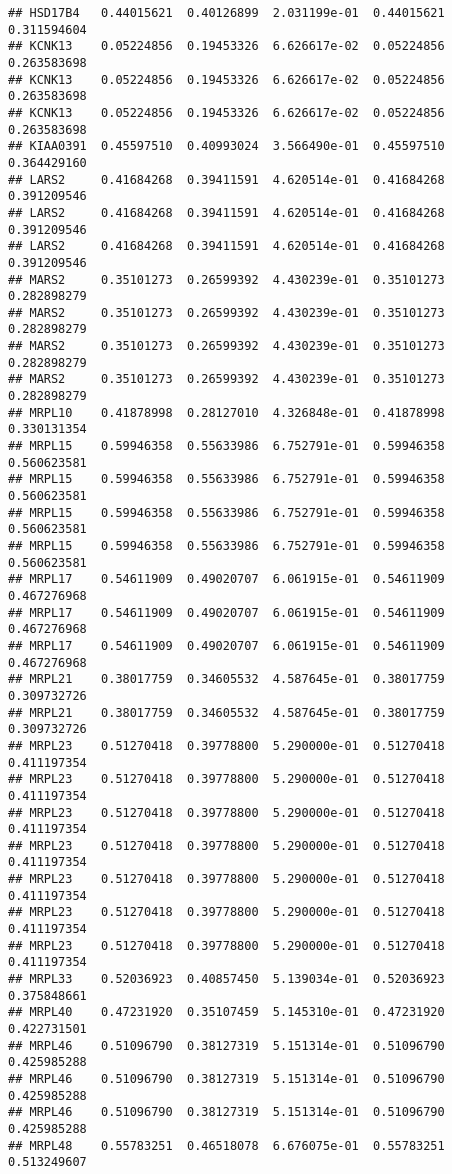 \documentclass[
]{article}
\begin{document}
\begin{verbatim}
## HSD17B4   0.44015621  0.40126899  2.031199e-01  0.44015621  0.311594604
## KCNK13    0.05224856  0.19453326  6.626617e-02  0.05224856  0.263583698
## KCNK13    0.05224856  0.19453326  6.626617e-02  0.05224856  0.263583698
## KCNK13    0.05224856  0.19453326  6.626617e-02  0.05224856  0.263583698
## KIAA0391  0.45597510  0.40993024  3.566490e-01  0.45597510  0.364429160
## LARS2     0.41684268  0.39411591  4.620514e-01  0.41684268  0.391209546
## LARS2     0.41684268  0.39411591  4.620514e-01  0.41684268  0.391209546
## LARS2     0.41684268  0.39411591  4.620514e-01  0.41684268  0.391209546
## MARS2     0.35101273  0.26599392  4.430239e-01  0.35101273  0.282898279
## MARS2     0.35101273  0.26599392  4.430239e-01  0.35101273  0.282898279
## MARS2     0.35101273  0.26599392  4.430239e-01  0.35101273  0.282898279
## MARS2     0.35101273  0.26599392  4.430239e-01  0.35101273  0.282898279
## MRPL10    0.41878998  0.28127010  4.326848e-01  0.41878998  0.330131354
## MRPL15    0.59946358  0.55633986  6.752791e-01  0.59946358  0.560623581
## MRPL15    0.59946358  0.55633986  6.752791e-01  0.59946358  0.560623581
## MRPL15    0.59946358  0.55633986  6.752791e-01  0.59946358  0.560623581
## MRPL15    0.59946358  0.55633986  6.752791e-01  0.59946358  0.560623581
## MRPL17    0.54611909  0.49020707  6.061915e-01  0.54611909  0.467276968
## MRPL17    0.54611909  0.49020707  6.061915e-01  0.54611909  0.467276968
## MRPL17    0.54611909  0.49020707  6.061915e-01  0.54611909  0.467276968
## MRPL21    0.38017759  0.34605532  4.587645e-01  0.38017759  0.309732726
## MRPL21    0.38017759  0.34605532  4.587645e-01  0.38017759  0.309732726
## MRPL23    0.51270418  0.39778800  5.290000e-01  0.51270418  0.411197354
## MRPL23    0.51270418  0.39778800  5.290000e-01  0.51270418  0.411197354
## MRPL23    0.51270418  0.39778800  5.290000e-01  0.51270418  0.411197354
## MRPL23    0.51270418  0.39778800  5.290000e-01  0.51270418  0.411197354
## MRPL23    0.51270418  0.39778800  5.290000e-01  0.51270418  0.411197354
## MRPL23    0.51270418  0.39778800  5.290000e-01  0.51270418  0.411197354
## MRPL23    0.51270418  0.39778800  5.290000e-01  0.51270418  0.411197354
## MRPL33    0.52036923  0.40857450  5.139034e-01  0.52036923  0.375848661
## MRPL40    0.47231920  0.35107459  5.145310e-01  0.47231920  0.422731501
## MRPL46    0.51096790  0.38127319  5.151314e-01  0.51096790  0.425985288
## MRPL46    0.51096790  0.38127319  5.151314e-01  0.51096790  0.425985288
## MRPL46    0.51096790  0.38127319  5.151314e-01  0.51096790  0.425985288
## MRPL48    0.55783251  0.46518078  6.676075e-01  0.55783251  0.513249607

\end{verbatim}
\end{document}
